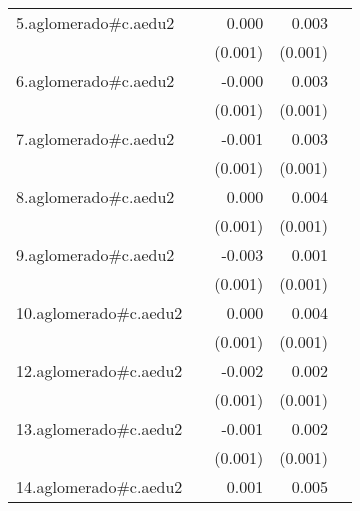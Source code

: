 {\begin{longtable}{l*{4}{D{.}{.}{-1}}}
\addlinespace
5.aglomerado#c.aedu2&                     &       0.000         &       0.003\sym{***}&                     \\
            &                     &     (0.001)         &     (0.001)         &                     \\
\addlinespace
6.aglomerado#c.aedu2&                     &      -0.000         &       0.003\sym{***}&                     \\
            &                     &     (0.001)         &     (0.001)         &                     \\
\addlinespace
7.aglomerado#c.aedu2&                     &      -0.001         &       0.003\sym{***}&                     \\
            &                     &     (0.001)         &     (0.001)         &                     \\
\addlinespace
8.aglomerado#c.aedu2&                     &       0.000         &       0.004\sym{***}&                     \\
            &                     &     (0.001)         &     (0.001)         &                     \\
\addlinespace
9.aglomerado#c.aedu2&                     &      -0.003         &       0.001         &                     \\
            &                     &     (0.001)         &     (0.001)         &                     \\
\addlinespace
10.aglomerado#c.aedu2&                     &       0.000         &       0.004\sym{***}&                     \\
            &                     &     (0.001)         &     (0.001)         &                     \\
\addlinespace
12.aglomerado#c.aedu2&                     &      -0.002         &       0.002\sym{*}  &                     \\
            &                     &     (0.001)         &     (0.001)         &                     \\
\addlinespace
13.aglomerado#c.aedu2&                     &      -0.001         &       0.002\sym{***}&                     \\
            &                     &     (0.001)         &     (0.001)         &                     \\
\addlinespace
14.aglomerado#c.aedu2&                     &       0.001         &       0.005\sym{***}&                     \\

\end{longtable}}
